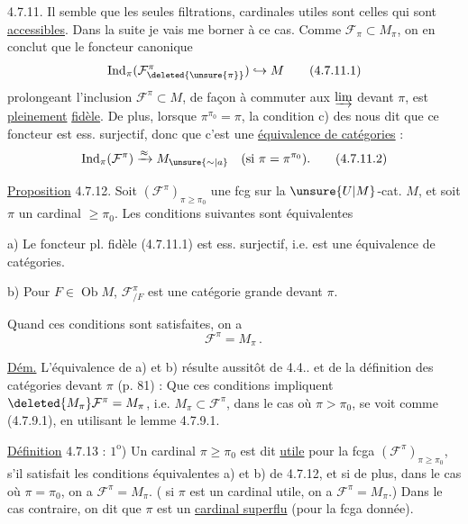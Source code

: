 4.7.11.  Il  semble que les seules  filtrations,
cardinales  utiles sont celles qui sont \uline{accessibles}.
 Dans la suite je vais me borner à ce
cas. Comme  $\mathcal F_\pi\subset M_\pi$, on en conclut
que le foncteur canonique
\[
\operatorname{Ind}_{\pi}(\mathcal F^\pi_{\deleted{\unsure{\pi}}})\hookrightarrow M
\tag*{(4.7.11.1)}
\]
prolongeant l'inclusion $\mathcal F^\pi\subset M$, de façon
à commuter aux $\varinjlim$  devant $\pi$, est
\uline{pleinement} \uline{fidèle}. De plus, lorsque
$\pi^{\pi_0}=\pi$, la condition c) des  nous dit
 que ce foncteur est ess. surjectif, donc
que c'est une \uline{équivalence de catégories} :
\[
\operatorname{Ind}_{\pi}(\mathcal F^\pi)\xrightarrow{\approx}M_{\unsure{\sim|a}}\quad
(\text{si }\pi=\pi^{\pi_0}).
\tag*{(4.7.11.2)}
\]

\uline{Proposition} 4.7.12. Soit $(\mathcal F^\pi)_{\pi\geq\pi_0}$ une fcg
 sur la $\unsure{U|M}$-cat. $M$, et soit $\pi$ un cardinal $\geq\pi_0$.
Les conditions suivantes sont équivalentes

a) Le foncteur pl. fidèle (4.7.11.1) est
ess. surjectif, i.e. est une équivalence de
catégories.

b) Pour  $F\in\operatorname{Ob}M$, $\mathcal F^\pi_{/F}$ est
une catégorie  grande devant $\pi$.

 Quand ces conditions sont satisfaites,  on a
\[
\mathcal F^\pi=M_\pi\mathpunct{.}
\tag*{(4.7.12.1)}
\]

\uline{Dém.} L'équivalence de a) et b) résulte
aussitôt de 4.4.. et de la définition
des catégories  devant $\pi$ (p. 81) : Que ces
conditions impliquent $\deleted{M_\pi}\mathcal F^\pi=M_\pi$, i.e. $M_\pi\subset\mathcal F^\pi$,
dans le cas où $\pi>\pi_0$, se voit comme (4.7.9.1),
en utilisant le lemme 4.7.9.1.

\uline{Définition} 4.7.13 : $1^{\mathrm{o}}$) Un cardinal $\pi\geq\pi_0$ est
dit  \uline{utile} pour la fcga $(\mathcal F^\pi)_{\pi\geq\pi_0}$, 
s'il satisfait les conditions équivalentes
a) et b) de 4.7.12, et si de plus, dans
le cas où $\pi=\pi_0$, on a  $\mathcal F^\pi=M_\pi$. (
si $\pi$ est un cardinal utile, on a   $\mathcal F^\pi=M_\pi$.)
Dans le cas contraire, on dit que $\pi$ est
un \uline{cardinal superflu} (pour la fcga
donnée).


